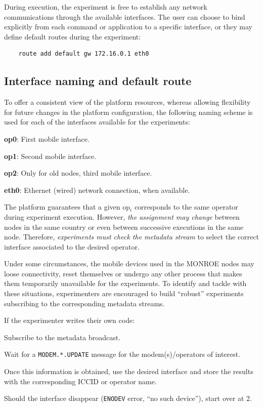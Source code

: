 \documentclass[a4paper,10pt]{article}
\newcommand{\VerbatimFont}{\footnotesize}
\newcommand{\monroe}{MONROE}
\newcommand{\identifier}[1]{{\texttt{\small{#1}}}}
\begin{document}
During execution, the experiment is free to establish any network communications through the available interfaces.
The user can choose to bind explicitly from each command or application to a specific interface, or they may define default routes during the experiment:
{\VerbatimFont\begin{verbatim}
	route add default gw 172.16.0.1 eth0
\end{verbatim}}

\subsection{Interface naming and default route}
\label{subsec:interfaceNaming}

To offer a consistent view of the platform resources, whereas allowing flexibility for future changes in the platform configuration, the following naming scheme is used for each of the interfaces available for the experiments:
\begin{enumerate*}
	\item [\textbf{op0}:] First mobile interface.
	\item [\textbf{op1}:] Second mobile interface.
	\item [\textbf{op2}:] Only for old nodes, third mobile interface.
	\item [\textbf{eth0}:] Ethernet (wired) network connection, when available.
\end{enumerate*}
The platform guarantees that a given op$_i$ corresponds to the same operator during experiment execution.
However, \emph{the assignment may change} between nodes in the same country or even between successive executions in the same node.
Therefore, \emph{experiments must check the metadata stream} to select the correct interface associated to the desired operator.

Under some circumstances, the mobile devices used in the \monroe{} nodes may loose connectivity, reset themselves or undergo any other process that makes them temporarily unavailable for the experiments.
To identify and tackle with these situations, experimenters are encouraged to build ``robust'' experiments subscribing to the corresponding metadata streams.

If the experimenter writes their own code:
\begin{enumerate*}
	\item Subscribe to the metadata broadcast.
	\item Wait for a \identifier{MODEM.*.UPDATE} message for the modem(s)/operators of interest.
	\item Once this information is obtained, use the desired interface and store the results with the corresponding ICCID or operator name.
	\item Should the interface disappear (\identifier{ENODEV} error, ``no such device''), start over at 2.
\end{enumerate*}
	
\end{document}

